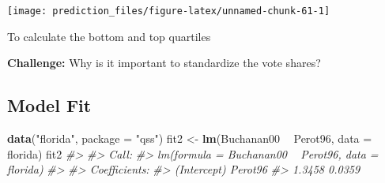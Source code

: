 \documentclass[]{book}
\newenvironment{Shaded}{\begin{snugshade}}{\end{snugshade}}
\newcommand{\CommentTok}[1]{\textcolor[rgb]{0.56,0.35,0.01}{\textit{#1}}}
\newcommand{\DataTypeTok}[1]{\textcolor[rgb]{0.13,0.29,0.53}{#1}}
\newcommand{\FloatTok}[1]{\textcolor[rgb]{0.00,0.00,0.81}{#1}}
\newcommand{\KeywordTok}[1]{\textcolor[rgb]{0.13,0.29,0.53}{\textbf{#1}}}
\newcommand{\NormalTok}[1]{#1}
\newcommand{\OperatorTok}[1]{\textcolor[rgb]{0.81,0.36,0.00}{\textbf{#1}}}
\newcommand{\StringTok}[1]{\textcolor[rgb]{0.31,0.60,0.02}{#1}}
\theoremstyle{definition}
\theoremstyle{definition}
\theoremstyle{definition}
\theoremstyle{remark}
\begin{document}
\begin{center}\texttt{[image: prediction\_files/figure-latex/unnamed-chunk-61-1]} \end{center}

To calculate the bottom and top quartiles

\begin{Shaded}
\end{Shaded}

\textbf{Challenge:} Why is it important to standardize the vote shares?

\hypertarget{model-fit}{%
\subsection{Model Fit}\label{model-fit}}

\begin{Shaded}
\begin{Highlighting}[]
\KeywordTok{data}\NormalTok{(}\StringTok{"florida"}\NormalTok{, }\DataTypeTok{package =} \StringTok{"qss"}\NormalTok{)}
\NormalTok{fit2 <-}\StringTok{ }\KeywordTok{lm}\NormalTok{(Buchanan00 }\OperatorTok{~}\StringTok{ }\NormalTok{Perot96, }\DataTypeTok{data =}\NormalTok{ florida)}
\NormalTok{fit2}
\CommentTok{#> }
\CommentTok{#> Call:}
\CommentTok{#> lm(formula = Buchanan00 ~ Perot96, data = florida)}
\CommentTok{#> }
\CommentTok{#> Coefficients:}
\CommentTok{#> (Intercept)      Perot96  }
\CommentTok{#>      1.3458       0.0359}
\end{Highlighting}
\end{Shaded}
\end{document}
